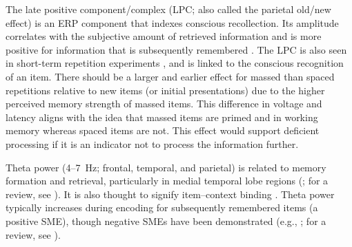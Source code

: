 The late positive component/complex (LPC; also called the parietal old/new effect) is an ERP component that indexes conscious recollection.  Its amplitude correlates with the subjective amount of retrieved information \cite{VilbEtal2006,Wild2000,WildRugg1996} and is more positive for information that is subsequently remembered \cite{RuggEtal2002,WagnEtal1999}.
The LPC is also seen in short-term repetition experiments \cite{OlicEtal2000,VanSEtal2007},
and is linked to the conscious recognition of an item.
There should be a larger and earlier effect for massed than spaced repetitions relative to new items (or initial presentations) due to the higher perceived memory strength of massed items.  This difference in voltage and latency aligns with the idea that massed items are primed and in working memory whereas spaced items are not.  This effect would support deficient processing if it is an indicator not to process the information further.


Theta power (4--7~Hz; frontal, temporal, and parietal) is related to memory formation and retrieval, particularly in medial temporal lobe regions (; for a review, see ).  It is also thought to signify item--context binding \cite{HansEtal2009a,HansEtal2011a,StauHans2013,SummMang2005}.  Theta power typically increases during encoding for subsequently remembered items (a positive SME), though negative SMEs have been demonstrated (e.g., ; for a review, see ).

